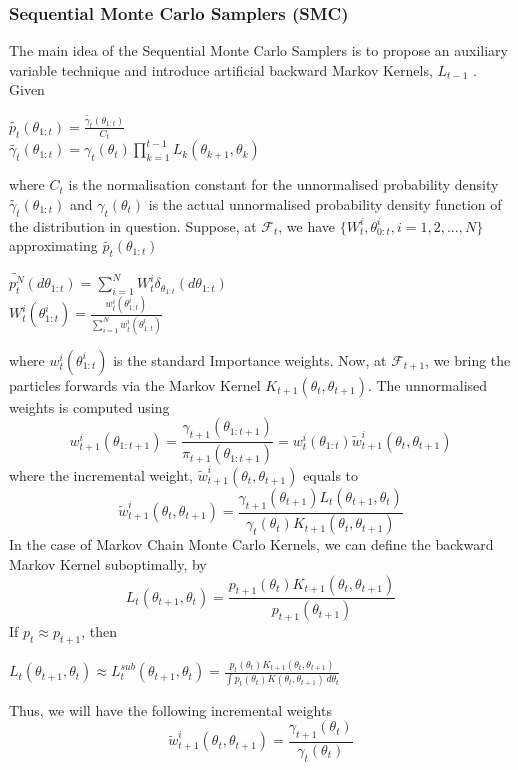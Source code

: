 \documentclass[12pt]{article}
\theoremstyle{definition}
\begin{document}
\subsubsection{Sequential Monte Carlo Samplers (SMC)}
The main idea of the Sequential Monte Carlo Samplers is to propose an auxiliary variable technique and introduce artificial backward Markov Kernels, $L_{t-1}$ \citep{del2006sequential}. Given
\begin{center}
$\widetilde{p_{t}}(\theta_{1:t}) = \frac{\widetilde{\gamma_{t}}(\theta_{1:t})}{C_{t}}$\\
$\widetilde{\gamma_{t}}(\theta_{1:t}) = \gamma_{t}(\theta_{t})\prod_{k=1}^{t-1} L_{k}(\theta_{k+1},\theta_{k})$
\end{center}
where $C_{t}$ is the normalisation constant for the unnormalised probability density $\widetilde{\gamma_{t}}(\theta_{1:t})$ and $\gamma_{t}(\theta_{t})$ is the actual unnormalised probability density function of the distribution in question. Suppose, at $\mathcal{F}_{t}$, we have $\{W^{i}_{t},\theta_{0:t}^{i},i=1,2,...,N\}$ approximating $\widetilde{p_{t}}(\theta_{1:t})$
\begin{center}
$\widetilde{p_{t}^{N}}(d\theta_{1:t})=\sum_{i=1}^{N} W^{i}_{t} \delta_{\theta_{1:t}}(d\theta_{1:t})$\\
$W^{i}_{t}(\theta^{i}_{1:t}) = \frac{w^{i}_{t}(\theta^{i}_{1:t})}{\sum_{i=1}^{N} w^{i}_{t}(\theta^{i}_{1:t})}$
\end{center}
where $w_{t}^{i}(\theta_{1:t}^{i})$ is the standard Importance weights. Now, at $\mathcal{F}_{t+1}$, we bring the particles forwards via the Markov Kernel $K_{t+1}(\theta_{t},\theta_{t+1})$. The unnormalised weights is computed using
\begin{equation}
w^{i}_{t+1}(\theta_{1:t+1}) = \frac{\gamma_{t+1}(\theta_{1:t+1})}{\pi_{t+1}(\theta_{1:t+1})} = w^{i}_{t}(\theta_{1:t})\widetilde{w}^{i}_{t+1}(\theta_{t},\theta_{t+1})
\end{equation}
where the incremental weight, $\widetilde{w}^{i}_{t+1}(\theta_{t},\theta_{t+1})$ equals to
\begin{equation}\label{eq:6}
\widetilde{w}^{i}_{t+1}(\theta_{t},\theta_{t+1}) = \frac{\gamma_{t+1}(\theta_{t+1})L_{t}(\theta_{t+1},\theta_{t})}{\gamma_{t}(\theta_{t})K_{t+1}(\theta_{t},\theta_{t+1})}
\end{equation}
In the case of Markov Chain Monte Carlo Kernels, we can define the backward Markov Kernel suboptimally, by
\begin{equation}\label{eq:7}
L_{t}(\theta_{t+1},\theta_{t}) = \frac{p_{t+1}(\theta_{t})K_{t+1}(\theta_{t},\theta_{t+1})}{p_{t+1}(\theta_{t+1})}
\end{equation}
If $p_{t} \approx p_{t+1}$, then
\begin{center}
$L_{t}(\theta_{t+1},\theta_{t})  \approx L^{sub}_{t}(\theta_{t+1},\theta_{t})  = \frac{p_{t}(\theta_{t})K_{t+1}(\theta_{t},\theta_{t+1})}{\int p_{t}(\theta_{t})K(\theta_{t},\theta_{t+1})\,d\theta_{t}}$
\end{center}
Thus, we will have the following incremental weights
\begin{equation}\label{eq:8}
\widetilde{w}_{t+1}^{i}(\theta_{t},\theta_{t+1}) = \frac{\gamma_{t+1}(\theta_{t})}{\gamma_{t}(\theta_{t})}
\end{equation}
\newpage
\end{document}

